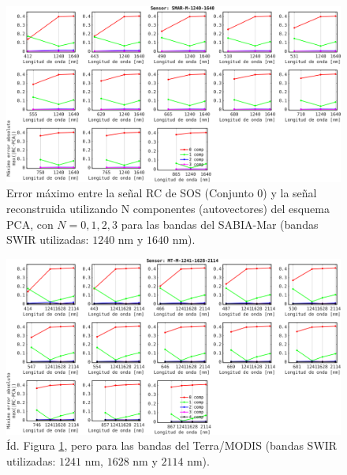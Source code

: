         \begin{figure}
        \centering
        \includegraphics[width=\textwidth]{pca/figures/PCAreconstructSOS_blackOcean_SMAR_M_1240_1640.png}
        \caption[Error máximo entre la señal RC de SOS (a agua negra) y la señal reconstruida por PCA (SABIA-Mar, bandas SWIR utilizadas: $1240$ nm y $1640$ nm).]{Error máximo entre la señal RC de SOS (Conjunto $0$) y la señal reconstruida utilizando N componentes (autovectores) del esquema PCA, con $N = 0,1,2,3$ para las bandas del SABIA-Mar (bandas SWIR utilizadas: $1240$ nm y $1640$ nm).}
        \label{pca:PCAreconstructSOS_blackOcean_SMAR_M_1240_1640}
        \end{figure}

        \begin{figure}
        \centering
        \includegraphics[width=\textwidth]{pca/figures/PCAreconstructSOS_blackOcean_MT_M_1241_1628_2114.png}
        \caption[Error máximo entre la señal RC de SOS (a agua negra) y la señal reconstruida por PCA (Terra/MODIS, bandas SWIR utilizadas: $1241$ nm, $1628$ nm y $2114$ nm).]{Íd. Figura \ref{pca:PCAreconstructSOS_blackOcean_SMAR_M_1240_1640}, pero para las bandas del Terra/MODIS (bandas SWIR utilizadas: $1241$ nm, $1628$ nm y $2114$ nm).}
        \label{pca:PCAreconstructSOS_blackOcean_MT_M_1241_1628_2114}
        \end{figure}

